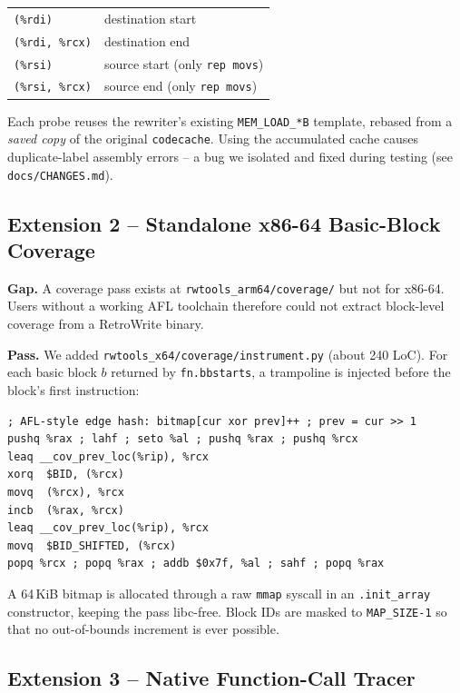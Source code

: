 \documentclass[10pt,a4paper]{article}
\begin{document}
\begin{center}
\small
\begin{tabular}{ll}
\texttt{(\%rdi)} & destination start \\
\texttt{(\%rdi, \%rcx)} & destination end \\
\texttt{(\%rsi)} & source start (only \texttt{rep movs}) \\
\texttt{(\%rsi, \%rcx)} & source end \hspace{1em}(only \texttt{rep movs})\\
\end{tabular}
\end{center}

Each probe reuses the rewriter's existing \texttt{MEM\_LOAD\_*B} template,
rebased from a \emph{saved copy} of the original \texttt{codecache}. Using
the accumulated cache causes duplicate-label assembly errors -- a bug we
isolated and fixed during testing (see \texttt{docs/CHANGES.md}).

\subsection{Extension 2 -- Standalone x86-64 Basic-Block Coverage}

\textbf{Gap.} A coverage pass exists at \texttt{rwtools\_arm64/coverage/} but
not for x86-64. Users without a working AFL toolchain therefore could not
extract block-level coverage from a RetroWrite binary.

\textbf{Pass.} We added \texttt{rwtools\_x64/coverage/instrument.py}
(about 240 LoC). For each basic block $b$ returned by \texttt{fn.bbstarts}, a
trampoline is injected before the block's first instruction:

\begin{lstlisting}[language={[x86masm]Assembler}]
; AFL-style edge hash: bitmap[cur xor prev]++ ; prev = cur >> 1
pushq %rax ; lahf ; seto %al ; pushq %rax ; pushq %rcx
leaq __cov_prev_loc(%rip), %rcx
xorq  $BID, (%rcx)
movq  (%rcx), %rcx
incb  (%rax, %rcx)
leaq __cov_prev_loc(%rip), %rcx
movq  $BID_SHIFTED, (%rcx)
popq %rcx ; popq %rax ; addb $0x7f, %al ; sahf ; popq %rax
\end{lstlisting}

A 64\,KiB bitmap is allocated through a raw \texttt{mmap} syscall in an
\texttt{.init\_array} constructor, keeping the pass libc-free. Block IDs are
masked to \texttt{MAP\_SIZE-1} so that no out-of-bounds increment is ever
possible.

\subsection{Extension 3 -- Native Function-Call Tracer}
\end{document}
